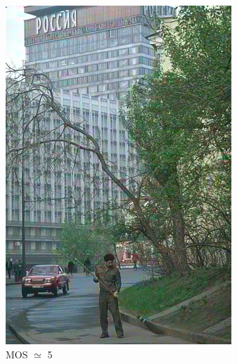 \documentclass{article}
\begin{document}
\begin{figure}[ht]
\begin{subfigure}{2.9cm}
  \includegraphics[width=0.9\linewidth]{figures/ac_shuffle_chrominance_76_274007}
  \caption{MOS $\simeq$ 5}
  \label{fig:sub2}
\end{subfigure}
\begin{subfigure}{2.9cm}
  \centering

\end{subfigure}
\end{figure}
\end{document}
